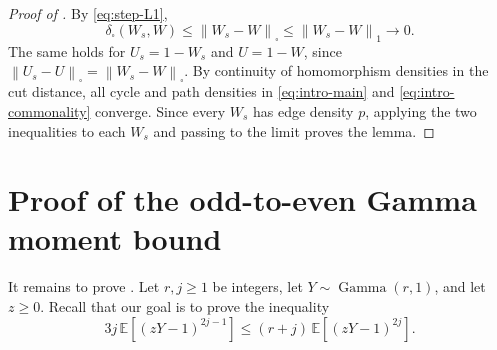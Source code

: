 \documentclass[11pt]{article}
\theoremstyle{remark}
\numberwithin{equation}{section}
\newcommand{\norm}[1]{\left\lVert #1\right\rVert}
\newcommand{\E}{\mathbb E}
\newcommand{\GammaLaw}{\operatorname{Gamma}}
\begin{document}
\begin{proof}[Proof of ]
  By \eqref{eq:step-L1},
  \[
    \delta_\square(W_s,W)
    \le\norm{W_s-W}_\square
    \le\norm{W_s-W}_1\longrightarrow0.
  \]
  The same holds for $U_s=1-W_s$ and $U=1-W$, since
  $\norm{U_s-U}_\square=\norm{W_s-W}_\square$.
  By continuity of homomorphism densities in the cut distance,
  all cycle and path densities in \eqref{eq:intro-main} and
  \eqref{eq:intro-commonality} converge.
  Since every $W_s$ has edge density $p$, applying the two inequalities
  to each $W_s$ and passing to the limit proves the lemma.
\end{proof}

\section{Proof of the odd-to-even Gamma moment bound}
\label{app:gamma-moment}

It remains to prove . Let $r,j\ge1$ be
integers, let $Y\sim\GammaLaw(r,1)$, and let $z\ge0$. Recall that our goal is to prove the inequality
\begin{equation}
  3j\,\E\left[(zY-1)^{2j-1}\right]
  \le(r+j)\,\E\left[(zY-1)^{2j}\right]. \label{eq:pge23-gamma-moment2}
\end{equation}
\end{document}
